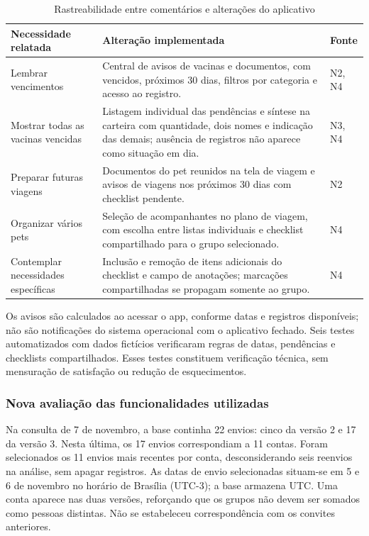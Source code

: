 \documentclass{UNESC}
\newcommand{\fonte}[1]{\par\noindent{\footnotesize\normalfont\raggedright Fonte: #1\par}}
\begin{document}
\begin{table}[htbp]
\centering
\caption{Rastreabilidade entre comentários e alterações do aplicativo}
\label{tab:rastreabilidade_feedbacks}
\footnotesize
\setlength{\tabcolsep}{4pt}
\renewcommand{\arraystretch}{1.15}
\begin{tabularx}{\linewidth}{@{}L{.27\linewidth}Y L{.12\linewidth}@{}}
\hline
\textbf{Necessidade relatada} & \textbf{Alteração implementada} & \textbf{Fonte} \\
\hline
Lembrar vencimentos & Central de avisos de vacinas e documentos, com vencidos, próximos 30 dias, filtros por categoria e acesso ao registro. & N2, N4 \\
Mostrar todas as vacinas vencidas & Listagem individual das pendências e síntese na carteira com quantidade, dois nomes e indicação das demais; ausência de registros não aparece como situação em dia. & N3, N4 \\
Preparar futuras viagens & Documentos do pet reunidos na tela de viagem e avisos de viagens nos próximos 30 dias com checklist pendente. & N2 \\
Organizar vários pets & Seleção de acompanhantes no plano de viagem, com escolha entre listas individuais e checklist compartilhado para o grupo selecionado. & N4 \\
Contemplar necessidades específicas & Inclusão e remoção de itens adicionais do checklist e campo de anotações; marcações compartilhadas se propagam somente ao grupo. & N4 \\
\hline
\end{tabularx}
\fonte{Elaborado pelo autor.}
\end{table}

Os avisos são calculados ao acessar o app, conforme datas e registros disponíveis; não são notificações do sistema operacional com o aplicativo fechado. Seis testes automatizados com dados fictícios verificaram regras de datas, pendências e checklists compartilhados. Esses testes constituem verificação técnica, sem mensuração de satisfação ou redução de esquecimentos.

\FloatBarrier
\subsubsection{Nova avaliação das funcionalidades utilizadas}

Na consulta de 7 de novembro, a base continha 22 envios: cinco da versão 2 e 17 da versão 3. Nesta última, os 17 envios correspondiam a 11 contas. Foram selecionados os 11 envios mais recentes por conta, desconsiderando seis reenvios na análise, sem apagar registros. As datas de envio selecionadas situam-se em 5 e 6 de novembro no horário de Brasília (UTC-3); a base armazena UTC. Uma conta aparece nas duas versões, reforçando que os grupos não devem ser somados como pessoas distintas. Não se estabeleceu correspondência com os convites anteriores.
\end{document}
